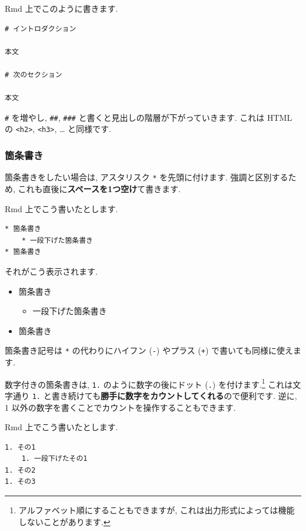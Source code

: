 \documentclass[
]{ltjsarticle}
\providecommand{\tightlist}{%
  \setlength{\itemsep}{0pt}\setlength{\parskip}{0pt}}
\begin{document}
Rmd 上でこのように書きます.

\begin{verbatim}
# イントロダクション

本文

# 次のセクション

本文
\end{verbatim}

\texttt{\#} を増やし, \texttt{\#\#}, \texttt{\#\#\#} と書くと見出しの階層が下がっていきます. これは HTML の \texttt{\textless{}h2\textgreater{}}, \texttt{\textless{}h3\textgreater{}}, \ldots{} と同様です.

\hypertarget{ux7b87ux6761ux66f8ux304d}{%
\subsubsection{箇条書き}\label{ux7b87ux6761ux66f8ux304d}}

箇条書きをしたい場合は, アスタリスク \texttt{*} を先頭に付けます. 強調と区別するため, これも直後に\textbf{スペースを1つ空け}て書きます.

Rmd 上でこう書いたとします.

\begin{verbatim}
* 箇条書き
    * 一段下げた箇条書き
* 箇条書き
\end{verbatim}

それがこう表示されます.

\begin{itemize}
\tightlist
\item
  箇条書き

  \begin{itemize}
  \tightlist
  \item
    一段下げた箇条書き
  \end{itemize}
\item
  箇条書き
\end{itemize}

箇条書き記号は \texttt{*} の代わりにハイフン (\texttt{-}) やプラス (\texttt{+}) で書いても同様に使えます.

数字付きの箇条書きは, \texttt{1.} のように数字の後にドット (\texttt{.}) を付けます.\footnote{アルファベット順にすることもできますが, これは出力形式によっては機能しないことがあります.} これは文字通り \texttt{1.} と書き続けても\textbf{勝手に数字をカウントしてくれる}ので便利です. 逆に, 1 以外の数字を書くことでカウントを操作することもできます.

Rmd 上でこう書いたとします.

\begin{verbatim}
1. その1
    1. 一段下げたその1
1. その2
1. その3
\end{verbatim}
\end{document}
